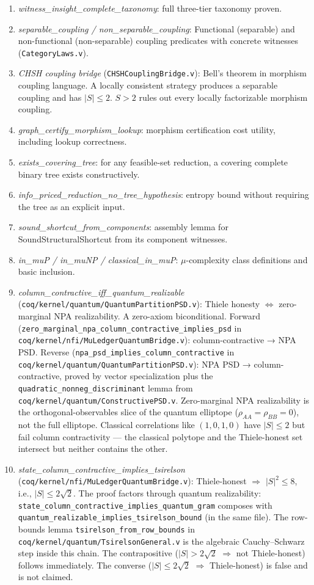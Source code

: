 \documentclass[11pt,a4paper]{article}
\theoremstyle{plain}
\theoremstyle{definition}
\theoremstyle{remark}
\begin{document}
{\begin{enumerate}
\item \textit{\small witness\_insight\_complete\_taxonomy}: full three-tier taxonomy proven.
\item \textit{\small separable\_coupling / non\_separable\_coupling}: Functional (separable) and non-functional (non-separable) coupling predicates with concrete witnesses (\texttt{CategoryLaws.v}).
\item \textit{\small CHSH coupling bridge} (\texttt{CHSHCouplingBridge.v}): Bell's theorem in morphism coupling language. A locally consistent strategy produces a separable coupling and has $|S| \leq 2$. $S > 2$ rules out every locally factorizable morphism coupling. \item \textit{\small graph\_certify\_morphism\_lookup}: morphism certification cost utility, including lookup correctness.
\item \textit{\small exists\_covering\_tree}: for any feasible-set reduction, a covering complete binary tree exists constructively.
\item \textit{\small info\_priced\_reduction\_no\_tree\_hypothesis}: entropy bound without requiring the tree as an explicit input.
\item \textit{\small sound\_shortcut\_from\_components}: assembly lemma for SoundStructuralShortcut from its component witnesses.
\item \textit{\small in\_muP / in\_muNP / classical\_in\_muP}: $\mu$-complexity class definitions and basic inclusion.
\item \textit{\small column\_contractive\_iff\_quantum\_realizable} (\texttt{coq/kernel/quantum/QuantumPartitionPSD.v}): Thiele honesty $\iff$ zero-marginal NPA realizability. A zero-axiom biconditional. Forward (\texttt{zero\_marginal\_npa\_column\_contractive\_implies\_psd} in \texttt{coq/kernel/nfi/MuLedgerQuantumBridge.v}): column-contractive → NPA PSD. Reverse (\texttt{npa\_psd\_implies\_column\_contractive} in \texttt{coq/kernel/quantum/QuantumPartitionPSD.v}): NPA PSD → column-contractive, proved by vector specialization plus the \texttt{quadratic\_nonneg\_discriminant} lemma from \texttt{coq/kernel/quantum/ConstructivePSD.v}. Zero-marginal NPA realizability is the orthogonal-observables slice of the quantum elliptope ($\rho_{AA}=\rho_{BB}=0$), not the full elliptope. Classical correlations like $(1,0,1,0)$ have $|S| \leq 2$ but fail column contractivity — the classical polytope and the Thiele-honest set intersect but neither contains the other.
\item \textit{\small state\_column\_contractive\_implies\_tsirelson} (\texttt{coq/kernel/nfi/MuLedgerQuantumBridge.v}): Thiele-honest $\Rightarrow$ $|S|^2 \leq 8$, i.e., $|S| \leq 2\sqrt{2}$. The proof factors through quantum realizability: \texttt{state\_column\_contractive\_implies\_quantum\_gram} composes with \texttt{quantum\_realizable\_implies\_tsirelson\_bound} (in the same file). The row-bounds lemma \texttt{tsirelson\_from\_row\_bounds} in \texttt{coq/kernel/quantum/TsirelsonGeneral.v} is the algebraic Cauchy--Schwarz step inside this chain. The contrapositive ($|S| > 2\sqrt{2}$ $\Rightarrow$ not Thiele-honest) follows immediately. The converse ($|S| \leq 2\sqrt{2}$ $\Rightarrow$ Thiele-honest) is false and is not claimed.

\end{enumerate}}
\end{document}
